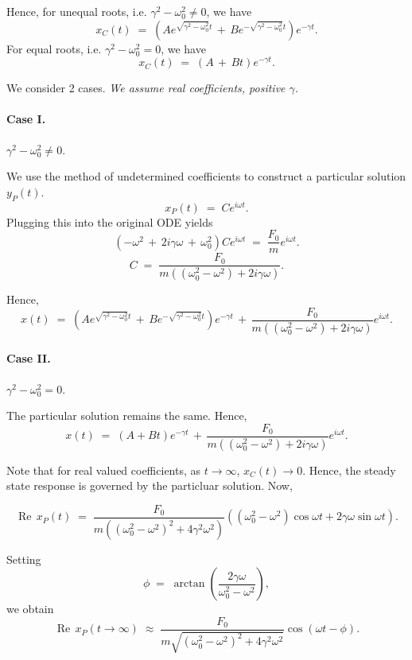 \documentclass[10pt]{article}
\DeclareMathOperator{\Real}{Re}
\begin{document}
        Hence, for unequal roots, i.e. $\gamma^2 - \omega_0^2 \neq 0$, we have
        \[
        x_C(t) \;=\; \left(Ae^{\sqrt{\gamma^2 - \omega_0^2} t} \,+\, Be^{-\sqrt{\gamma^2 - \omega_0^2} t}\right)e^{-\gamma t}.
        \]
        For equal roots, i.e. $\gamma^2 - \omega_0^2 = 0$, we have
        \[
        x_C(t) \;=\; \left(A \,+\, Bt\right)e^{-\gamma t}.
        \]

        We consider 2 cases. {\it{We assume real coefficients, positive $\gamma$.}}
        \paragraph{Case I.} $\gamma^2 - \omega_0^2 \neq 0$.

        We use the method of undetermined coefficients to construct a particular solution $y_P(t)$.
        \[
        x_P(t) \;=\; Ce^{i\omega t}.
        \]
        Plugging this into the original ODE yields
        \[
        (-\omega^2 \,+\, 2i\gamma\omega \,+\, \omega_0^2)Ce^{i\omega t} \;=\; \frac{F_0}{m}e^{i\omega t}.
        \]
        \[
        C \;=\; \frac{F_0}{m((\omega_0^2 - \omega^2) + 2i\gamma\omega)}.
        \]

        Hence,
        \[
        x(t) \;=\; \left(Ae^{\sqrt{\gamma^2 - \omega_0^2} t} \,+\, Be^{-\sqrt{\gamma^2 - \omega_0^2} t}\right)e^{-\gamma t}
                \,+\, \frac{F_0}{m((\omega_0^2 - \omega^2) + 2i\gamma\omega)}e^{i\omega t}.
        \]
        
        \paragraph{Case II.} $\gamma^2 - \omega_0^2 = 0$.
        
        The particular solution remains the same.
        Hence,
        \[
        x(t) \;=\; (A + Bt)e^{-\gamma t}
                \,+\, \frac{F_0}{m((\omega_0^2 - \omega^2) + 2i\gamma\omega)}e^{i\omega t}.
        \]

        
        Note that for real valued coefficients, as $t \to \infty$, $x_C(t) \to 0$. Hence, the steady state response is 
        governed by the particluar solution. Now,

        \[
        \Real\, x_P(t) \;=\; \frac{F_0}{m((\omega_0^2 - \omega^2)^2 + 4\gamma^2\omega^2)}
                \left((\omega_0^2 - \omega^2) \cos{\omega t} + 2\gamma\omega\sin{\omega t}\right).
        \]

        Setting
        \[
                \phi \;=\; \arctan\left(\frac{2\gamma\omega}{\omega_0^2 - \omega^2}\right),
        \]
        we obtain
        \[
        \Real\, x_P(t\to\infty) \;\approx\; \frac{F_0}{m\sqrt{(\omega_0^2 - \omega^2)^2 + 4\gamma^2\omega^2}} \cos(\omega t - \phi).
        \]
        
\end{document}
